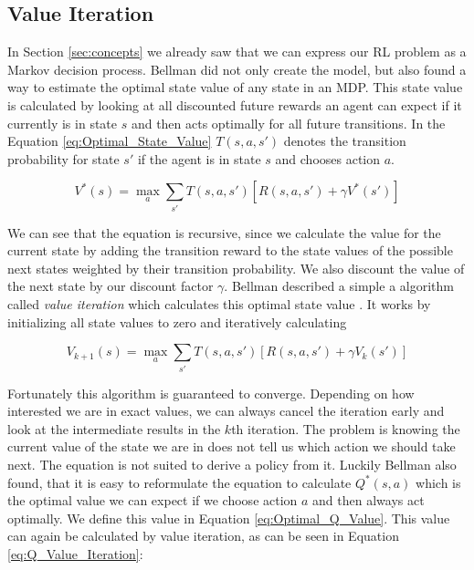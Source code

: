 \subsection{Value Iteration} \label{ssec:Value_Iteration}

In Section \ref{sec:concepts} we already saw that we can express our RL problem as a Markov decision process. Bellman did not only create the model, but also found a way to estimate the optimal state value of any state in an MDP. This state value is calculated by looking at all discounted future rewards an agent can expect if it currently is in state $s$ and then acts optimally for all future transitions. In the Equation \ref{eq:Optimal_State_Value} $T(s, a, s')$ denotes the transition probability for state $s'$ if the agent is in state $s$ and chooses action $a$.  

\begin{equation} \label{eq:Optimal_State_Value}
V^*(s) = \max_a \sum_{s'} T(s, a, s')\left[ R(s, a, s') + \gamma V^*(s')\right]
\end{equation}

We can see that the equation is recursive, since we calculate the value for the current state by adding the transition reward to the state values of the possible next states weighted by their transition probability. We also discount the value of the next state by our discount factor $\gamma$. Bellman described a simple a algorithm called \textit{value iteration} which calculates this optimal state value \cite{bellman1957markovian}. It works by initializing all state values to zero and iteratively calculating

\[V_{k+1}(s) = \max_a \sum_{s'} T(s, a, s')\left[ R(s, a, s') + \gamma V_k(s')\right]\]

Fortunately this algorithm is guaranteed to converge. Depending on how interested we are in exact values, we can always cancel the iteration early and look at the intermediate results in the $k$th iteration. The problem is knowing the current value of the state we are in does not tell us which action we should take next. The equation is not suited to derive a policy from it. Luckily Bellman also found, that it is easy to reformulate the equation to calculate $Q^*(s, a)$ which is the optimal value we can expect if we choose action $a$ and then always act optimally. We define this value in Equation \ref{eq:Optimal_Q_Value}. This value can again be calculated by value iteration, as can be seen in Equation \ref{eq:Q_Value_Iteration}:

